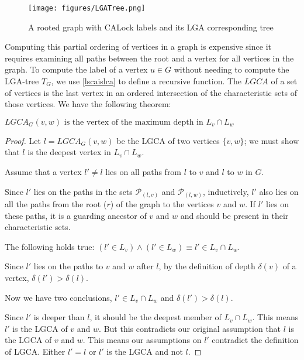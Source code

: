 \begin{figure}
	\centering
	\captionsetup{justification=centering}
	\texttt{[image: figures/LGATree.png]}
	\caption{A rooted graph with CALock labels and its LGA corresponding tree} \label{fig:LGATree}
\end{figure}

Computing this partial ordering of vertices in a graph is expensive since it requires examining all paths between the root and a vertex for all vertices in the graph. To compute the label of a vertex $u \in G$ without needing to compute the LGA-tree $T_G$, we use \cref{lscaislca} to define a recursive function. 
The $LGCA$ of a set of vertices is the last vertex in an ordered intersection of the characteristic sets of those vertices. We have the following theorem:

\begin{theorem} \label{proofOfDeepness}
	$\mathit{LGCA}_G(v,w) \text{ is the vertex of the maximum depth in } L_v\cap L_w$
\end{theorem}

\begin{proof}
	 Let $l = LGCA_G(v,w)$ be the LGCA of two vertices $\{v, w\}$; we must show that $l$ is the deepest vertex in  $L_v \cap L_w$.

	Assume that a vertex $l' \neq l$ lies on all paths from $l$ to $v$ and $l$ to $w$ in $G$.

	Since $l'$ lies on the paths in the sets $\mathcal{P}_{(l,v)}$ and $\mathcal{P}_{(l,w)}$, inductively, $l'$ also lies on all the paths from the root ($r$) of the graph to the vertices $v$ and $w$.
	If  $l'$ lies on these paths, it is a guarding ancestor of $v$ and $w$ and should be present in their characteristic sets.
	
	The following holds true: $(l' \in L_v) \land (l' \in L_w) \equiv l' \in L_v \cap L_w$.

	Since $l'$ lies on the paths to $v$ and $w$ after $l$, by the definition of depth $\delta(v)$ of a vertex,	$\delta(l') > \delta(l)$.

	Now we have two conclusions, $l' \in L_v \cap L_w$ and $\delta(l') > \delta(l)$.

	Since $l'$ is deeper than $l$, it should be the deepest member of  $ L_v \cap L_w$.
	This means $l'$ is the LGCA of $v$ and $w$.
	But this contradicts our original assumption that $l$ is the LGCA of $v$ and $w$.
	This means our assumptions on $l'$ contradict the definition of LGCA. Either $l'=l$ or $l'$ is the LGCA and not $l$.
\end{proof}


